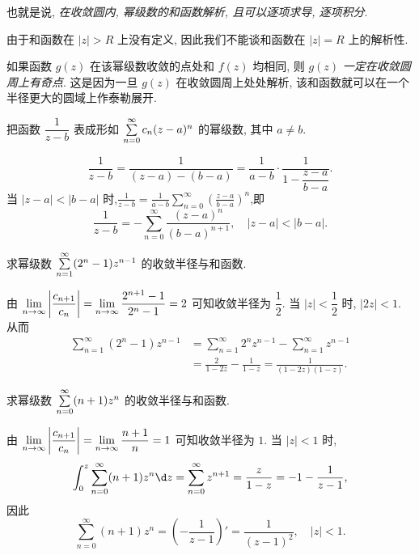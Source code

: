 也就是说, \emph{在收敛圆内, 幂级数的和函数解析, 且可以逐项求导, 逐项积分}.

由于和函数在 $|z|>R$ 上没有定义, 因此我们不能谈和函数在 $|z|=R$ 上的解析性.

如果函数 $g(z)$ 在该幂级数收敛的点处和 $f(z)$ 均相同, 则 $g(z)$ \emph{一定在收敛圆周上有奇点}.
这是因为一旦 $g(z)$ 在收敛圆周上处处解析, 该和函数就可以在一个半径更大的圆域上作泰勒展开.

\begin{example}
	把函数 $\dfrac1{z-b}$ 表成形如 $\sum\limits_{n=0}^\infty c_n(z-a)^n$ 的幂级数, 其中 $a\neq b$.
\end{example}

\begin{solution}
	\[\frac1{z-b}=\frac1{(z-a)-(b-a)}
	{=\frac1{a-b}\cdot\frac1{1-\dfrac{z-a}{b-a}}.}\]
	{当 $|z-a|<|b-a|$ 时,$\displaystyle\frac1{z-b}=\frac1{a-b}\sum_{n=0}^\infty\left(\frac{z-a}{b-a}\right)^n$,即
	\[\frac1{z-b}=-\sum_{n=0}^\infty\frac{(z-a)^n}{(b-a)^{n+1}},\quad|z-a|<|b-a|.\]}
\end{solution}

\begin{example}
	求幂级数 $\sum\limits_{n=1}^\infty(2^n-1)z^{n-1}$ 的收敛半径与和函数.
\end{example}

\begin{solution}
	由 $\displaystyle\lim_{n\to\infty}\left|\frac{c_{n+1}}{c_n}\right|=\lim_{n\to\infty}\frac{2^{n+1}-1}{2^n-1}=2$ 可知收敛半径为 $\dfrac12$.
	{当 $|z|<\dfrac12$ 时, $|2z|<1$.}
	{从而
	\begin{align*}
	\sum_{n=1}^\infty(2^n-1)z^{n-1}&=\sum_{n=1}^\infty 2^n z^{n-1}-\sum_{n=1}^\infty z^{n-1}\\
	&{=\frac2{1-2z}-\frac1{1-z}=\frac1{(1-2z)(1-z)}.}
	\end{align*}}
\end{solution}

\begin{example}
	求幂级数 $\sum\limits_{n=0}^\infty(n+1)z^n$ 的收敛半径与和函数.
\end{example}

\begin{solution}
	由 $\displaystyle\lim_{n\to\infty}\left|\frac{c_{n+1}}{c_n}\right|=\lim_{n\to\infty}\frac{n+1}n=1$ 可知收敛半径为 $1$.
{当 $|z|<1$ 时,
	\[\int_0^z\sum_{n=0}^\infty(n+1)z^n\d z=\sum_{n=0}^\infty z^{n+1}=\frac z{1-z}=-1-\frac1{z-1},\]
}{因此
	\[\sum_{n=0}^\infty(n+1)z^n=\left(-\frac1{z-1}\right)'=\frac1{(z-1)^2},\quad |z|<1.\]}
\end{solution}

